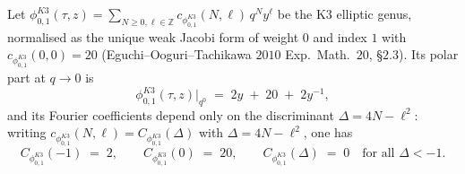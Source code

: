 \begin{lemma}
\label{lem:polar-support-phi-K3}
Let $\phi^{K3}_{0,1}(\tau, z) = \sum_{N\ge 0,\ell\in\mathbb{Z}}
c_{\phi^{K3}_{0,1}}(N, \ell)\,q^N y^\ell$ be the K3 elliptic genus,
normalised as the unique weak Jacobi form of weight $0$ and index $1$ with
$c_{\phi^{K3}_{0,1}}(0, 0) = 20$ (Eguchi--Ooguri--Tachikawa
$2010$ \textup{Exp.~Math.}~$20$, \S $2.3$). Its polar part at $q \to 0$ is
\[
 \phi^{K3}_{0,1}(\tau, z)\Big|_{q^0}
 \;=\;
 2y \;+\; 20 \;+\; 2y^{-1},
\]
and its Fourier coefficients depend only on the discriminant
$\Delta = 4N - \ell^2$: writing
$c_{\phi^{K3}_{0,1}}(N, \ell) = C_{\phi^{K3}_{0,1}}(\Delta)$ with
$\Delta = 4N - \ell^2$, one has
\[
 C_{\phi^{K3}_{0,1}}(-1) \;=\; 2,
 \qquad
 C_{\phi^{K3}_{0,1}}(0) \;=\; 20,
 \qquad
 C_{\phi^{K3}_{0,1}}(\Delta) \;=\; 0
 \quad\text{for all } \Delta < -1.
\]
\end{lemma}

